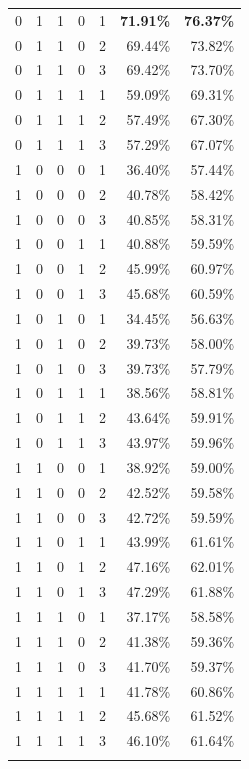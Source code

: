 \begin{longtable}{rrrrrrr}
	0     & 1     & 1     & 0     & 1     & \textbf{71.91\%} & \textbf{76.37\%} \\
	0     & 1     & 1     & 0     & 2     & 69.44\% & 73.82\% \\
	0     & 1     & 1     & 0     & 3     & 69.42\% & 73.70\% \\
	0     & 1     & 1     & 1     & 1     & 59.09\% & 69.31\% \\
	0     & 1     & 1     & 1     & 2     & 57.49\% & 67.30\% \\
	0     & 1     & 1     & 1     & 3     & 57.29\% & 67.07\% \\
	1     & 0     & 0     & 0     & 1     & 36.40\% & 57.44\% \\
	1     & 0     & 0     & 0     & 2     & 40.78\% & 58.42\% \\
	1     & 0     & 0     & 0     & 3     & 40.85\% & 58.31\% \\
	1     & 0     & 0     & 1     & 1     & 40.88\% & 59.59\% \\
	1     & 0     & 0     & 1     & 2     & 45.99\% & 60.97\% \\
	1     & 0     & 0     & 1     & 3     & 45.68\% & 60.59\% \\
	1     & 0     & 1     & 0     & 1     & 34.45\% & 56.63\% \\
	1     & 0     & 1     & 0     & 2     & 39.73\% & 58.00\% \\
	1     & 0     & 1     & 0     & 3     & 39.73\% & 57.79\% \\
	1     & 0     & 1     & 1     & 1     & 38.56\% & 58.81\% \\
	1     & 0     & 1     & 1     & 2     & 43.64\% & 59.91\% \\
	1     & 0     & 1     & 1     & 3     & 43.97\% & 59.96\% \\
	1     & 1     & 0     & 0     & 1     & 38.92\% & 59.00\% \\
	1     & 1     & 0     & 0     & 2     & 42.52\% & 59.58\% \\
	1     & 1     & 0     & 0     & 3     & 42.72\% & 59.59\% \\
	1     & 1     & 0     & 1     & 1     & 43.99\% & 61.61\% \\
	1     & 1     & 0     & 1     & 2     & 47.16\% & 62.01\% \\
	1     & 1     & 0     & 1     & 3     & 47.29\% & 61.88\% \\
	1     & 1     & 1     & 0     & 1     & 37.17\% & 58.58\% \\
	1     & 1     & 1     & 0     & 2     & 41.38\% & 59.36\% \\
	1     & 1     & 1     & 0     & 3     & 41.70\% & 59.37\% \\
	1     & 1     & 1     & 1     & 1     & 41.78\% & 60.86\% \\
	1     & 1     & 1     & 1     & 2     & 45.68\% & 61.52\% \\
	1     & 1     & 1     & 1     & 3     & 46.10\% & 61.64\% \\
	\bottomrule
	\label{tab:preprocessing-params}
\end{longtable}%

